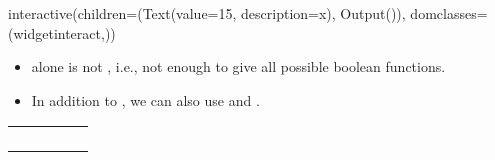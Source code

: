 \documentclass[letterpaper,10pt,english]{sphinxmanual}
\begin{document}
\begin{sphinxVerbatim}[commandchars=\\\{\}]
interactive(children=(Text(value=\PYGZsq{}15\PYGZsq{}, description=\PYGZsq{}x\PYGZsq{}), Output()), \PYGZus{}dom\PYGZus{}classes=(\PYGZsq{}widget\PYGZhy{}interact\PYGZsq{},))
\end{sphinxVerbatim}
\begin{itemize}
\item {} 
 alone is not ,  i.e., not enough to give all possible boolean functions.

\item {} 
In addition to , we can also use  and .

\end{itemize}


\begin{savenotes}\sphinxattablestart
\centering
\begin{tabulary}{\linewidth}[t]{|T|T|T|T|T|}
\hline
\sphinxstyletheadfamily 
{}
&\sphinxstyletheadfamily 
{}
&\sphinxstyletheadfamily 
{}
&\sphinxstyletheadfamily 
{}
&\sphinxstyletheadfamily 
{}
\\
\hline
{}
&
&
&
&
\\
\hline
{}
&
&
&
&
\\
\hline
{}
&
&
&
&
\\
\hline
{}
&
&
&
&
\\
\hline
\end{tabulary}
\par
\sphinxattableend\end{savenotes}
\end{document}
